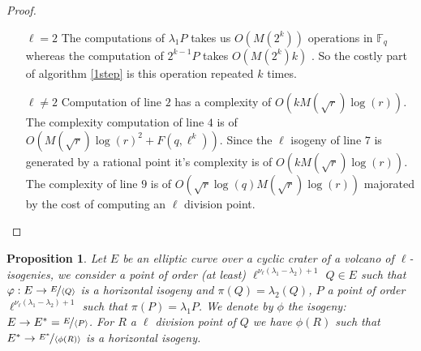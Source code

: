 \documentclass{article}
\theoremstyle{plain}
\newtheorem{prop}[thm]{Proposition}
\theoremstyle{definition}
\theoremstyle{remark}
\begin{document}
\begin{proof}
\begin{enumerate}
\item[$\ell=2$] The computations of $\lambda_1P$ takes us $O(M(2^k))$ operations in $\mathbb{F}_q$ whereas the computation of $2^{k-1}P$ takes $O(M(2^k)k)$ . So the costly part of algorithm \ref{1step} is this operation repeated $k$ times. 
\item[$\ell \neq 2$] Computation of line $2$ has a complexity of $O(kM(\sqrt{r})\log(r))$. The complexity computation of line $4$ is of $O(M(\sqrt{r})\log(r)^2+ F(q,\ell^k))$. Since the $\ell$ isogeny of line $7$ is generated by a rational point it's complexity is of $O(kM(\sqrt{r})\log(r))$. The complexity of line $9$ is of $O(\sqrt{r}\log(q)M(\sqrt{r})\log(r))$ majorated by the cost of computing an $\ell$ division point.
\end{enumerate} 
\end{proof}

\begin{prop}\label{propcentrale}
Let $E$ be an elliptic curve over a cyclic crater of a volcano of $\ell$-isogenies, we consider a  point of order (at least) $\ell^{\nu_{\ell}(\lambda_1-\lambda_2)+1}$ $Q \in E$ such that $\varphi: E \rightarrow \nicefrac{E}{\langle Q \rangle }$ is a horizontal isogeny and $\pi(Q)=\lambda_2(Q)$, $P$ a point of order $\ell^{\nu_{\ell}(\lambda_1-\lambda_2)+1}$ such that $\pi(P) = \lambda_1P$. We denote by $\phi$ the isogeny: $E\rightarrow E^*=\nicefrac{E}{\langle P \rangle}$. For $R$ a $\ell$ division point of $Q$ we have $\phi(R)$ such that $E^* \rightarrow \nicefrac{E^*}{\langle \phi(R) \rangle}$ is a horizontal isogeny.  
\end{prop}
\end{document}
